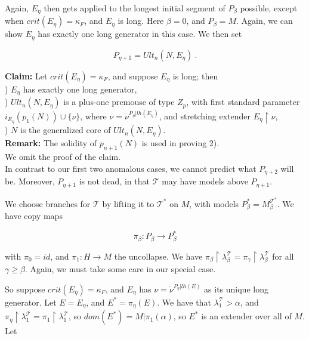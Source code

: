 \documentclass[12pt]{article}
\begin{document}
Again, $E_\eta$ then gets applied to the longest initial segment of $P_\beta$ possible, except when $crit(E_\eta) = \kappa_F$, and $E_\eta$ is long.  Here $\beta = 0$, and $P_\beta = M$.  Again, we can show $E_\eta$ has exactly one long generator in this case.  We then set

\[
P_{\eta + 1} = Ult_n (N, E_\eta) \ .
\]

\textbf{Claim:} Let $crit(E_\eta) = \kappa_F$, and suppose $E_\eta$ is long; then\\

\indent {}) $E_\eta$ has exactly one long generator,\\

\indent {}) $Ult_n (N, E_\eta )$ is a plus-one premouse of type $Z_p$, with first standard parameter $i_{E_\eta} (p_1 (N)) \cup \{ \nu \}$, where $\nu = \dot{\nu}^{P_\eta | lh(E_\eta)}$, and stretching extender $E_\eta \restriction \nu$,\\

\indent {}) $N$ is the generalized core of $Ult_n (N, E_\eta)$.\\

\textbf{Remark:} The solidity of $p_{n+1}(N)$ is used in proving 2).\\

We omit the proof of the claim.\\

In contrast to our first two anomalous cases, we cannot predict what $P_{\eta + 2}$ will be.  Moreover, $P_{\eta + 1}$ is not dead, in that $\mathscr{T}$ may have models above $P_{\eta + 1}$.

We choose branches for $\mathscr{T}$ by lifting it to $\mathscr{T}^*$ on $M$, with models $P_\beta^* = M_\beta^{\mathscr{T}^*}$.  We have copy maps

\[
\pi_\beta: P_\beta \longrightarrow P_\beta^*
\]

with $\pi_0 = id$, and $\pi_1 : H \longrightarrow M$ the uncollapse.  We have $\pi_\beta \restriction \lambda_\beta^{\mathscr{T}} = \pi_\gamma \restriction \lambda_\beta^{\mathscr{T}}$ for all $\gamma \geq \beta$.  Again, we must take some care in our special case.

So suppose $crit(E_\eta) = \kappa_F$, and $E_\eta$ has $\nu = \dot{\nu}^{P_\eta | lh(E)}$ as its unique long generator.  Let $E = E_\eta$, and $E^* = \pi_\eta (E)$.  We have that $\lambda_1^{\mathscr{T}} > \alpha$, and $\pi_\eta \restriction \lambda_1^{\mathscr{T}} = \pi_1 \restriction \lambda_1^{\mathscr{T}}$, so $dom(E^*) = M | \pi_1 (\alpha)$, so $E^*$ is an extender over all of $M$.  Let
\end{document}
